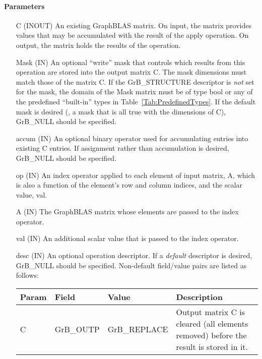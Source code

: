 \paragraph{Parameters}

\begin{itemize}[leftmargin=1.1in]
    \item[{\sf C}]    ({\sf INOUT}) An existing GraphBLAS matrix. On input,
    the matrix provides values that may be accumulated with the result of the
    apply operation.  On output, the matrix holds the results of the
    operation.

    \item[{\sf Mask}] ({\sf IN}) An optional ``write'' mask that controls which
    results from this operation are stored into the output matrix {\sf C}. The 
    mask dimensions must match those of the matrix {\sf C}. If the 
    {\sf GrB\_STRUCTURE} descriptor is {\em not} set for the mask, the domain of the 
    {\sf Mask} matrix must be of type {\sf bool} or any of the predefined 
    ``built-in'' types in Table~\ref{Tab:PredefinedTypes}.  If the default
    mask is desired (\ie, a mask that is all {\sf true} with the dimensions of {\sf C}), 
    {\sf GrB\_NULL} should be specified.

    \item[{\sf accum}] ({\sf IN}) An optional binary operator used for accumulating
    entries into existing {\sf C} entries. If assignment rather than accumulation is
    desired, {\sf GrB\_NULL} should be specified.

    \item[{\sf op}] ({\sf IN}) An index operator applied to each element of input 
    matrix, {\sf A}, which is also a function of the element's row and column indices,
    and the scalar value, {\sf val}.

    \item[{\sf A}] ({\sf IN}) The GraphBLAS matrix whose elements are passed 
    to the index operator.

    \item[{\sf val}] ({\sf IN}) An additional scalar value that is passed to the 
	index operator.
	
    \item[{\sf desc}] ({\sf IN}) An optional operation descriptor. If
    a \emph{default} descriptor is desired, {\sf GrB\_NULL} should be
    specified. Non-default field/value pairs are listed as follows:  \\

    \hspace*{-2em}\begin{tabular}{lllp{2.7in}}
        Param & Field  & Value & Description \\
        \hline
        {\sf C}    & {\sf GrB\_OUTP} & {\sf GrB\_REPLACE} & Output matrix {\sf C}
        is cleared (all elements removed) before the result is stored in it.\\


\end{tabular}
\end{itemize}
